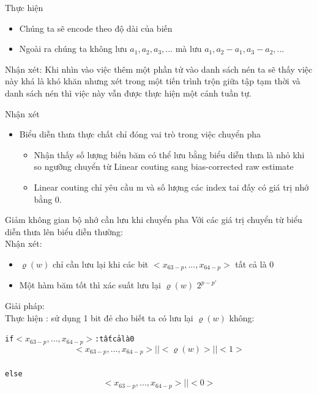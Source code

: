 \documentclass{beamer}
\newcommand{\bi}{\begin{itemize}}
\newcommand{\ei}{\end{itemize}}
\begin{document}
\begin{frame}{Thực hiện}
\begin{itemize}
\item Chúng ta sẽ encode theo độ dài của biến
\item Ngoài ra chúng ta không lưu $a_1,a_2,a_3,...$ mà lưu $ a_1,a_2-a_1,a_3-a_2,...$\\

\end{itemize}

{\color{hilight} Nhận xét:} Khi nhìn vào việc thêm một phần tử vào danh sách nén ta sẽ thấy việc này khá là khó khăn nhưng xét trong một tiến trình trộn giữa tập tạm thời và danh sách nén thì việc này vẫn được thực hiện một cánh tuần tự.
\end{frame}

\begin{frame}{Nhận xét}
\bi 
\item Biểu diễn thưa thực chất chỉ đóng vai trò trong việc chuyển pha
\bi
\item Nhận thấy số lượng biến băm có thể lưu bằng biểu diễn thưa là nhỏ khi so ngưỡng chuyển từ Linear couting sang bias-corrected raw estimate  \\
\item Linear couting  chỉ yêu cầu m và số lượng các index tai đấy có giá trị nhớ bằng 0.\\
\ei
\ei
\end{frame}
\begin{frame}{Giảm không gian bộ nhớ cần lưu khi chuyển pha} 
Với các giá trị chuyển từ biểu diễn thưa lên biểu diễn thường:\\
{\color{hilight} Nhận xét:}\\
\bi
 \item $\varrho(w)$ chỉ cần lưu lại khi các bit $<x_{63-p} ,...,x_{64-p}>$ tất cả là 0
\item  Một hàm băm tốt thì xác suất lưu lại  $\varrho(w)$ $ 2^{p-p'}$
\ei 
{\color{hilight} Giải pháp:}
\\Thực hiện : sử dụng 1 bit đẻ cho biết ta có lưu lại $\varrho(w)$ không:
\begin{alltt}
 if $<x_{63-p} ,...,x_{64-p}>$ :tất cả là 0  $$<x_{63-p} ,...,x_{64-p}> || <\varrho(w)>||<1>$$
else $$<x_{63-p} ,...,x_{64-p}> ||<0>$$ 
\end{alltt}
\end{frame}
\end{document}
